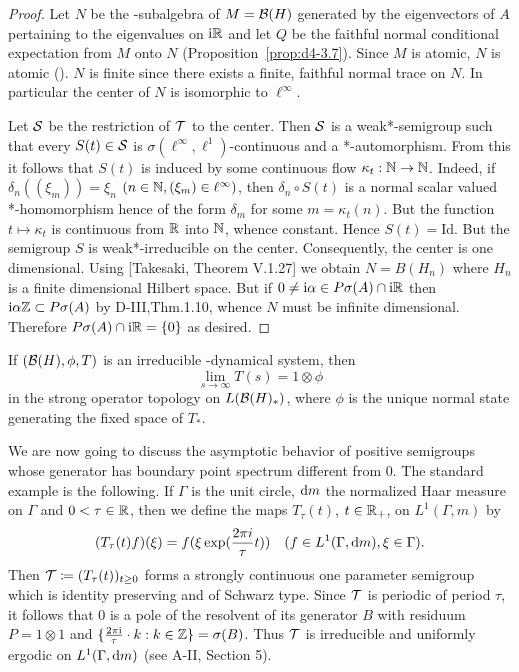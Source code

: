 \begin{proof}
Let $ N $  be the \WA-subalgebra of $ M = \mathcal{B}(H) $  generated by the eigenvectors of $ A $  pertaining to the eigenvalues on $ \mathrm{i}\mathbb{R} $  and let $ Q $  be the faithful normal conditional expectation from $ M $  onto $ N $  (Proposition~\ref{prop:d4-3.7}).
Since $ M $  is atomic, $ N $  is atomic (\citet{stormer:1972}).
$ N $  is finite since there exists a finite, faithful normal trace on $ N $.
In particular the center of $ N $  is isomorphic to $ \ell^{\infty} $.

Let $ \mathcal{S} $  be the restriction of $ \mathcal{T} $  to the center.
Then $ \mathcal{S} $  is a weak*-semigroup such that every $ S(t) \in \mathcal{S} $  is $ \sigma(\ell^{\infty},\ell^{1}) $-continuous and a *-automorphism.
From this it follows that $ S(t) $  is induced by some continuous flow $ \kappa_{t}: \mathbb{N} \to \mathbb{N} $.
Indeed, if $ \delta_{n}((\xi_{m})) = \xi_{n} $  $ (n \in \mathbb{N}, (\xi_{m}) \in \ell^{\infty}) $, then $ \delta_{n} \circ S(t) $  is a normal scalar valued *-homomorphism hence of the form $ \delta_{m} $  for some $ m = \kappa_{t}(n) $.
But the function $ t \mapsto \kappa_{t} $  is continuous from $ \mathbb{R} $  into $ \mathbb{N} $, whence constant.
Hence $ S(t) = \text{Id} $.
But the semigroup $ S $  is weak*-irreducible on the center.
Consequently, the center is one dimensional.
Using [Takesaki, Theorem V.1.27] we obtain $ N = B(H_{n}) $  where $ H_{n} $  is a finite dimensional Hilbert space.
But if $ 0 \neq \mathrm{i}\alpha \in P\sigma(A) \cap \mathrm{i}\mathbb{R} $  then $ \mathrm{i}\alpha\mathbb{Z} \subset P\sigma(A) $  by D-III,Thm.1.10, whence $ N $  must be infinite dimensional.
Therefore $ P\sigma(A) \cap \mathrm{i}\mathbb{R} = \{0\} $  as desired.
\end{proof}
\begin{corollary}\label{cor:d4-3.9}
If $ (\mathcal{B}(H),\phi,T) $  is an irreducible \WA-dynamical system, then
\[
	\lim_{s \to \infty} T(s) = 1 \otimes \phi
\]
in the strong operator topology on $ L(\mathcal{B}(H)_{*}) $, where $ \phi $  is the unique normal state generating the fixed space of $ T_{*} $.
\end{corollary}
We are now going to discuss the asymptotic behavior of positive semigroups whose generator has boundary point spectrum different from $ 0 $.
The standard example is the following.
If $ \Gamma $  is the unit circle, $ \mathop{}\!\mathrm{d}{m} $  the normalized Haar measure on $ \Gamma $  and $ 0 < \tau \in \mathbb{R} $, then we define the maps $ T_{\tau}(t) $, $ t \in \mathbb{R}_{+} $, on $ L^{1}(\Gamma,m) $  by
\[
(T_{\tau}(t)f)(\xi) = f(\xi\exp(\frac{2\pi i}{\tau}t)) \quad (f \in L^{1}(\Gamma,\mathop{}\!\mathrm{d}{m}), \xi \in \Gamma).
\]
Then $ \mathcal{T} \coloneqq (T_{\tau}(t))_{t \geq 0} $  forms a strongly continuous one parameter semigroup which is identity preserving and of Schwarz type.
Since $ \mathcal{T} $  is periodic of period $ \tau $, it follows that 0 is a pole of the resolvent of its generator $ B $  with residuum $ P = 1 \otimes 1 $  and $ \{\frac{2\pi \mathrm{i}}{\tau} \cdot k: k \in \mathbb{Z}\} = \sigma(B) $.
Thus $ \mathcal{T} $  is irreducible and uniformly ergodic on $ L^{1}(\Gamma,\mathop{}\!\mathrm{d}{m}) $  (see A-II, Section 5).

